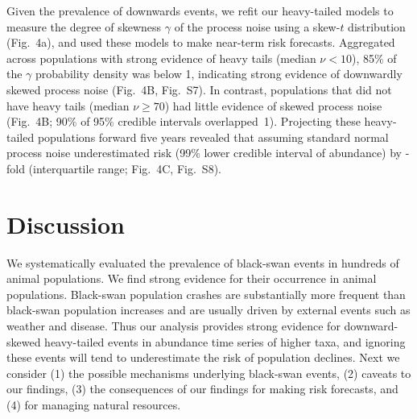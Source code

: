 \documentclass[9pt,twocolumn,twoside]{pnas-new}
\newcommand{\figskewnu}{{7}}
\newcommand{\figskewprojections}{{8}}
\begin{document}
Given the prevalence of downwards events, we refit our heavy-tailed models to
measure the degree of skewness \(\gamma\) of the process noise using a skew-$t$
distribution (Fig.~4a), and used these models to make near-term risk forecasts.
Aggregated across populations with strong evidence of heavy tails (median \(\nu
< 10\)), 85\% of the \(\gamma\) probability density was below 1, indicating
strong evidence of downwardly skewed process noise (Fig.~4B,
Fig.~S\figskewnu). In contrast, populations that did not have heavy
tails (median \(\nu \geq 70\)) had little evidence of skewed process noise
(Fig.~4B; 90\% of 95\% credible intervals overlapped~1). Projecting these
heavy-tailed populations forward five years revealed that assuming standard
normal process noise underestimated risk (99\% lower credible interval of
abundance) by \crashUnderRange-fold (interquartile range; Fig.~4C,
Fig.~S\figskewprojections).

\section*{Discussion}

We systematically evaluated the prevalence of black-swan events in hundreds of
animal populations.
We find strong evidence for their occurrence in animal populations. Black-swan
population crashes are substantially more frequent
than black-swan population
increases and are usually driven by external events such as weather and
disease.
Thus our analysis provides strong evidence
for downward-skewed heavy-tailed events in abundance time series of higher
taxa, and ignoring these events will tend to underestimate the risk of
population declines.
Next we consider
(1) the possible mechanisms underlying black-swan events,
(2) caveats to our findings,
(3) the consequences of our findings for making risk forecasts, and
(4) for managing natural resources.

\end{document}
